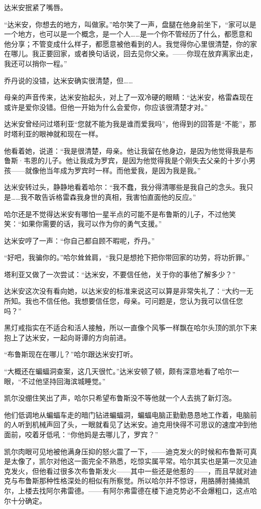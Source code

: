 \documentclass[../main]{subfiles}
\begin{document}
达米安抿紧了嘴唇。

“达米安，你想去的地方，叫做家。”哈尔笑了一声，盘腿在他身前坐下，“家可以是一个地方，也可以是一个概念，是一个人……是一个你不管经历了什么，都愿意和他分享；不管变成什么样子，都愿意被他看到的人。我觉得你心里很清楚，你的家在哪儿。我正要回家，或者换句话说，回去见你父亲。——你现在放弃离家出走，我还可以捎你一程。”

乔丹说的没错，达米安确实很清楚，但……

母亲的声音传来，达米安抬起头，对上了一双冷硬的眼睛：“达米安，格雷森现在或许是爱你没错。但他一开始为什么会爱你，你应该很清楚才对。”

达米安曾经问过塔利亚“您就不能为我是谁而爱我吗”，他得到的回答是“不能”，那时塔利亚的眼神就和现在一样。

他看着她，说道：“我是很清楚，母亲。他让我留在他身边，是因为他觉得我是布鲁斯·韦恩的儿子。他让我成为罗宾，是因为他觉得我是个刚失去父亲的十岁小男孩——就像他当年成为罗宾时一样。而他爱我，是因为我是我。”

达米安转过头，静静地看着哈尔：“我不蠢，我分得清哪些是我自己的念头。我只是……我不敢告诉格雷森我身世的真相，我害怕直面他的反应。”

哈尔还是不觉得达米安有哪怕一星半点的可能不是布鲁斯的儿子，不过他笑笑：“如果你需要的话，我可以作为你的勇气支援。”

达米安哼了一声：“你自己都自顾不暇呢，乔丹。”

“好吧，我骗你的。”哈尔耸耸肩，“我只是想抢下把你带回家的功劳，将功折罪。”

塔利亚又做了一次尝试：“达米安，不要信任他，关于你的事他了解多少？”

达米安这次没有看向她，以达米安的标准来说这可以算是非常失礼了：“大约一无所知。我也不信任他。我想要信任您，母亲。可问题是，您认为我可以信任您吗？”

黑灯戒指实在不适合和活人接触，所以一直像个风筝一样飘在哈尔头顶的凯尔下来抱上了达米安，一起向哥谭的方向前进。

“布鲁斯现在在哪儿？”哈尔跟达米安打听。

“大概还在蝙蝠洞查案，这几天很忙。”达米安顿了顿，颇有深意地看了哈尔一眼，“不过他坚持回海滨城睡觉。”

凯尔没绷住笑出了声，哈尔只希望布鲁斯没不等他就一个人去挑了新灯泡。

他们低调地从蝙蝠车走的暗门钻进蝙蝠洞，蝙蝠电脑正勤勤恳恳地工作着，电脑前的人听到机械声回了头，一眼就看见了达米安。迪克用快得不可思议的速度冲到他面前，咬着牙低吼：“你他妈是去哪儿了，罗宾？”

凯尔肉眼可见地被他满身压抑的怒火震了一下，——迪克发火的时候和布鲁斯可真是太像了，凯尔对他这一面完全不熟悉，吃惊实属平常。哈尔其实也是第一次见迪克发火，但他看过很多次布鲁斯发火——其中一些还是他惹的——，而且早就对迪克与布鲁斯那种性格深处的相似有所察觉。所以哈尔并不惊讶，用胳膊肘捅捅凯尔，上楼去找阿尔弗雷德。——有阿尔弗雷德在楼下迪克势必不会爆粗口，这点哈尔十分确定。
\end{document}
